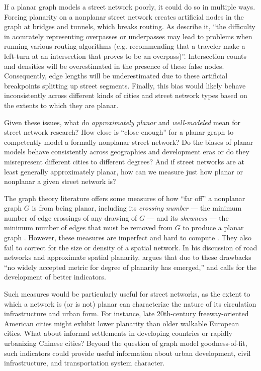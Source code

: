 \documentclass[Afour,sageh,times]{sagej}
\begin{document}
If a planar graph models a street network poorly, it could do so in multiple ways. Forcing planarity on a nonplanar street network creates artificial nodes in the graph at bridges and tunnels, which breaks routing. As \citet[p.~6]{kwan_review_1996} describe it, \enquote{the difficulty in accurately representing overpasses or underpasses may lead to problems when running various routing algorithms (e.g. recommending that a traveler make a left-turn at an intersection that proves to be an overpass)}. Intersection counts and densities will be overestimated in the presence of these false nodes. Consequently, edge lengths will be underestimated due to these artificial breakpoints splitting up street segments. Finally, this bias would likely behave inconsistently across different kinds of cities and street network types based on the extents to which they are planar.

Given these issues, what do \emph{approximately planar} and \emph{well-modeled} mean for street network research? How close is \enquote{close enough} for a planar graph to competently model a formally nonplanar street network? Do the biases of planar models behave consistently across geographies and development eras or do they misrepresent different cities to different degrees? And if street networks are at least generally approximately planar, how can we measure just how planar or nonplanar a given street network is?

The graph theory literature offers some measures of how \enquote{far off} a nonplanar graph $G$ is from being planar, including its \emph{crossing number} --- the minimum number of edge crossings of any drawing of $G$ --- and its \emph{skewness} --- the minimum number of edges that must be removed from $G$ to produce a planar graph \citep{liebers_planarizing_2001,szekely_successful_2004,chimani_non-planar_2009}. However, these measures are imperfect and hard to compute \citep{chimani_vertex_2012,szekely_successful_2004}. They also fail to correct for the size or density of a spatial network. In his discussion of road networks and approximate spatial planarity, \citet[p.~133]{newman_networks:_2010} argues that due to these drawbacks \enquote{no widely accepted metric for degree of planarity has emerged,} and calls for the development of better indicators.

Such measures would be particularly useful for street networks, as the extent to which a network is (or is not) planar can characterize the nature of its circulation infrastructure and urban form. For instance, late 20th-century freeway-oriented American cities might exhibit lower planarity than older walkable European cities. What about informal settlements in developing countries or rapidly urbanizing Chinese cities? Beyond the question of graph model goodness-of-fit, such indicators could provide useful information about urban development, civil infrastructure, and transportation system character.
\end{document}
